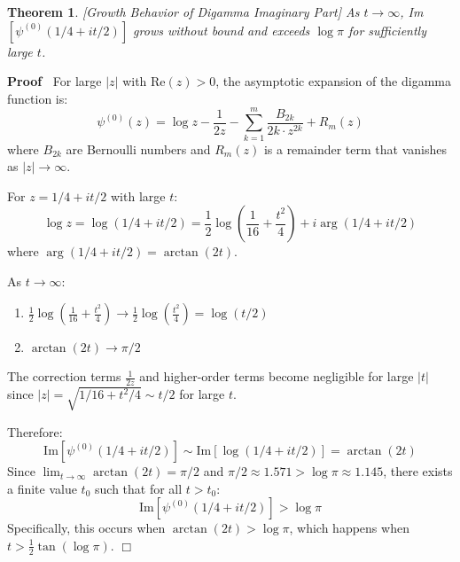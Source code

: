 \documentclass{article}
\newenvironment{proof}{\noindent\textbf{Proof\ }}{\hspace*{\fill}$\Box$\medskip}
\newtheorem{theorem}{Theorem}
\begin{document}
\begin{theorem}
  \label{growth-behavior}[Growth Behavior of Digamma Imaginary Part] As $t \to
  \infty$, Im$[\psi^{(0)} (1 / 4 + it / 2)]$ grows without bound and exceeds
  $\log \pi$ for sufficiently large $t$.
\end{theorem}

\begin{proof}
  For large $|z|$ with Re$(z) > 0$, the asymptotic expansion of the digamma
  function is:
  \begin{equation}
    \psi^{(0)} (z) = \log z - \frac{1}{2 z} - \sum_{k = 1}^m \frac{B_{2 k}}{2
    k \cdot z^{2 k}} + R_m (z)
  \end{equation}
  where $B_{2 k}$ are Bernoulli numbers and $R_m (z)$ is a remainder term that
  vanishes as $|z| \to \infty$.
  
  For $z = 1 / 4 + it / 2$ with large $t$:
  \begin{equation}
    \log z = \log (1 / 4 + it / 2) = \frac{1}{2} \log \left( \frac{1}{16} +
    \frac{t^2}{4} \right) + i \arg (1 / 4 + it / 2)
  \end{equation}
  where $\arg (1 / 4 + it / 2) = \arctan (2 t)$.
  
  As $t \to \infty$:
  \begin{enumerate}
    \item $\frac{1}{2} \log \left( \frac{1}{16} + \frac{t^2}{4} \right) \to
    \frac{1}{2} \log \left( \frac{t^2}{4} \right) = \log (t / 2)$
    
    \item $\arctan (2 t) \to \pi / 2$
  \end{enumerate}
  The correction terms $\frac{1}{2 z}$ and higher-order terms become
  negligible for large $|t|$ since $|z| = \sqrt{1 / 16 + t^2 / 4} \sim t / 2$
  for large $t$.
  
  Therefore:
  \begin{equation}
    \text{Im} [\psi^{(0)} (1 / 4 + it / 2)] \sim \text{Im} [\log (1 / 4 + it /
    2)] = \arctan (2 t)
  \end{equation}
  Since $\lim_{t \to \infty} \arctan (2 t) = \pi / 2$ and $\pi / 2 \approx
  1.571 > \log \pi \approx 1.145$, there exists a finite value $t_0$ such that
  for all $t > t_0$:
  \begin{equation}
    \text{Im} [\psi^{(0)} (1 / 4 + it / 2)] > \log \pi
  \end{equation}
  Specifically, this occurs when $\arctan (2 t) > \log \pi$, which happens
  when $t > \frac{1}{2} \tan (\log \pi)$.
\end{proof}
\end{document}
